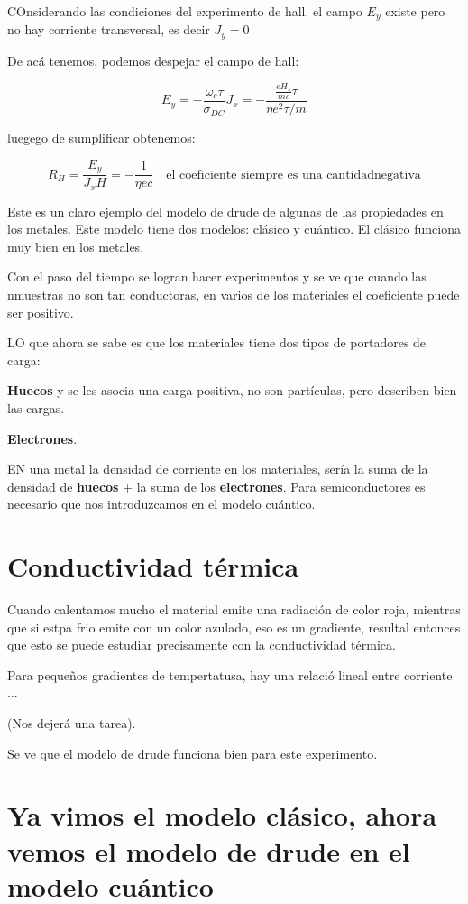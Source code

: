 \documentclass{article}
\begin{document}
COnsiderando las condiciones del experimento de hall. el campo $E_{y}$ existe pero no hay corriente transversal, es decir $J_{y}=0$



De acá tenemos, podemos despejar el campo de hall:

\[  E_{y} = - \frac{ \omega_{c}\tau }{\sigma_{DC}}J_{x} = - \frac{ \frac{e H_{z}}{mc}\tau }{\eta e^{2}\tau/m} \]


luegego de sumplificar obtenemos:


\[ \boxed{  R_{H} = \frac{E_{y}}{J_{x}H} = - \frac{1}{\eta e c} } \quad \text{el coeficiente siempre es una cantidadnegativa}  \]

Este es un claro ejemplo del modelo de drude de algunas de las propiedades en los metales. Este modelo tiene dos modelos: \underline{clásico} y \underline{cuántico}. El \underline{clásico} funciona muy bien en los metales. 


Con el paso del tiempo se logran hacer experimentos y se ve que cuando las nmuestras no son tan conductoras, en varios de los materiales el coeficiente puede ser positivo. 


LO que ahora se sabe es que los materiales tiene dos tipos de portadores de carga:

\textbf{Huecos} y se les asocia una carga positiva, no son partículas, pero describen bien las cargas.

\textbf{Electrones}.


EN una metal la densidad de corriente en los materiales, sería la suma de la densidad de \textbf{huecos} + la suma de los \textbf{electrones}. Para semiconductores es necesario que nos introduzcamos en el modelo cuántico.


\section{Conductividad térmica}

Cuando calentamos mucho el material emite una radiación de color roja, mientras que si estpa frio emite con un color azulado, eso es un gradiente, resultal entonces que esto se puede estudiar precisamente con la conductividad térmica. 


Para pequeños gradientes de tempertatusa, hay una relació lineal entre corriente ...

(Nos dejerá una tarea).


Se ve que el modelo de drude funciona bien para este experimento.


\section{Ya vimos el modelo clásico, ahora vemos el modelo de drude en el modelo cuántico}
\end{document}
